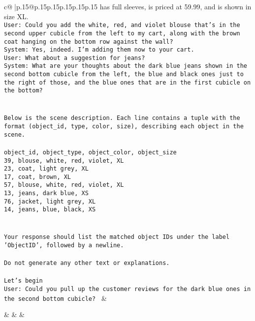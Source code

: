 \documentclass{article}
\begin{document}
{\begin{supertabular}{c@{$\;$}|p{.15\linewidth}@{}p{.15\linewidth}p{.15\linewidth}p{.15\linewidth}p{.15\linewidth}p{.15\linewidth}}
{{{has full sleeves, is priced at 59.99, and is shown in size XL.\\ \tt User: Could you add the white, red, and violet blouse that's in the second upper cubicle from the left to my cart, along with the brown coat hanging on the bottom row against the wall?\\ \tt System: Yes, indeed. I'm adding them now to your cart.\\ \tt User: What about a suggestion for jeans?\\ \tt System: What are your thoughts about the dark blue jeans shown in the second bottom cubicle from the left, the blue and black ones just to the right of those, and the blue ones that are in the first cubicle on the bottom?\\ \tt \\ \tt \\ \tt Below is the scene description. Each line contains a tuple with the format (object_id, type, color, size), describing each object in the scene.\\ \tt \\ \tt object_id, object_type, object_color, object_size\\ \tt 39, blouse, white, red, violet, XL\\ \tt 23, coat, light grey, XL\\ \tt 17, coat, brown, XL\\ \tt 57, blouse, white, red, violet, XL\\ \tt 13, jeans, dark blue, XS\\ \tt 76, jacket, light grey, XL\\ \tt 14, jeans, blue, black, XS\\ \tt \\ \tt \\ \tt Your response should list the matched object IDs under the label 'ObjectID', followed by a newline.\\ \tt \\ \tt Do not generate any other text or explanations.\\ \tt \\ \tt Let's begin\\ \tt User: Could you pull up the customer reviews for the dark blue ones in the second bottom cubicle? 
	  } 
	   } 
	   } 
	 & \\ 
 

    \theutterance {}  

    &  
	 & & \\ 
 


\end{supertabular}}
\end{document}
